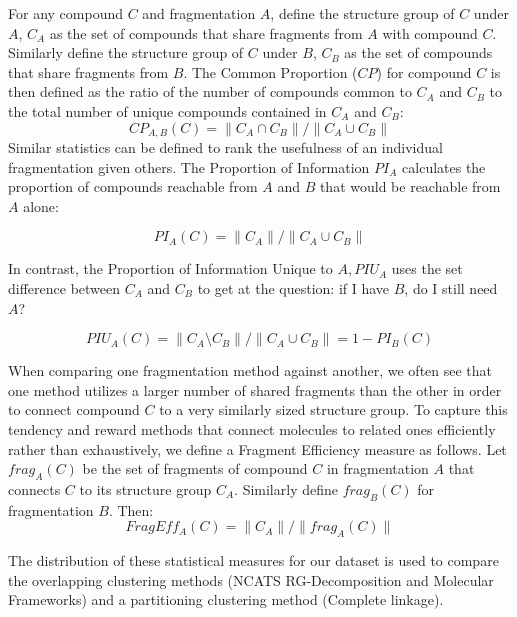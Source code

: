 \documentclass[journal=jacsat,biochem,manuscript=article]{achemso}
\begin{document}
For any compound $C$ and fragmentation $A$, define the structure group of
$C$ under $A$, $C_A$ as the set of compounds that share fragments from
$A$ with compound $C$. Similarly define the structure group of $C$
under $B$, $C_B$ as the set of compounds that share fragments from
$B$. The Common Proportion ($CP$) for compound $C$ is then defined as
the ratio of the number of compounds common to $C_A$ and $C_B$ to the
total number of unique compounds contained in $C_A$ and $C_B$:
\begin{equation}
CP_{A,B}(C) = \| C_A \cap C_B \| / \| C_A \cup C_B \|
\end{equation}
Similar statistics can be defined to rank the usefulness of an
individual fragmentation given others. The Proportion of Information
$PI_A$ calculates the proportion of compounds reachable from $A$ and
$B$ that would be reachable from $A$ alone:

\begin{equation}
PI_A(C) = \| C_A \| / \| C_A \cup C_B \|
\end{equation}

In contrast, the Proportion of Information Unique to $A, PIU_A$ uses the set difference between $C_A$ and $C_B$ to get at the question: if I have $B$, do I still need $A$? 

\begin{equation}
 PIU_A(C) = \| C_A \setminus C_B \| / \| C_A \cup C_B \| = 1 - PI_B(C)
 \end{equation}
  
 When comparing one fragmentation method against another, we often see
 that one method utilizes a larger number of shared fragments than the
 other in order to connect compound $C$ to a very similarly sized
 structure group. To capture this tendency and reward methods that
 connect molecules to related ones efficiently rather than
 exhaustively, we define a Fragment Efficiency measure as follows. Let
 $frag_A(C)$ be the set of fragments of compound $C$ in fragmentation
 $A$ that connects $C$ to its structure group $C_A$. Similarly define
 $frag_B(C)$ for fragmentation $B$. Then:
\begin{equation}
FragEff_A(C) = \| C_A \| / \| frag_A(C) \|
\end{equation}


The distribution of these statistical measures for our dataset is used
to compare the overlapping clustering methods (NCATS RG-Decomposition
and Molecular Frameworks) and a partitioning clustering method
(Complete linkage).
\end{document}
